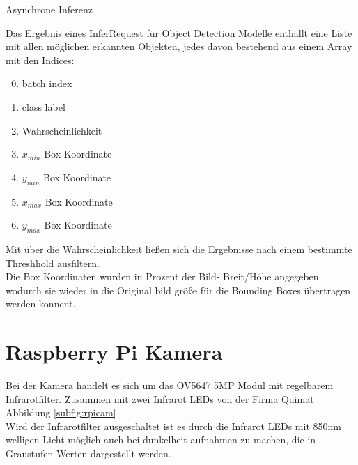 \begin{algorithm}[H]
    \caption{Asynchrone Inferenz}
\end{algorithm}


Das Ergebnis eines InferRequest für Object Detection Modelle 
enthällt eine Liste mit allen möglichen erkannten Objekten, jedes 
davon bestehend aus einem Array mit den Indices:

\begin{enumerate}
    \setcounter{enumi}{-1}
    \item batch index
    \item class label
    \item Wahrscheinlichkeit
    \item $x_{min}$ Box Koordinate
    \item $y_{min}$ Box Koordinate
    \item $x_{max}$ Box Koordinate
    \item $y_{max}$ Box Koordinate
\end{enumerate}

Mit über die Wahrscheinlichkeit ließen sich die Ergebnisse 
nach einem bestimmte Threshhold ausfiltern.\\
Die Box Koordinaten wurden in Prozent der Bild- Breit/Höhe 
angegeben wodurch sie wieder in die Original bild größe 
für die Bounding Boxes übertragen werden konnent.




\section{Raspberry Pi Kamera}\label{sec:raspicam}


Bei der Kamera handelt es sich um das OV5647 5MP Modul mit regelbarem 
Infrarotfilter. Zusammen mit zwei Infrarot LEDs von der Firma Quimat 
Abbildung \ref{subfig:rpicam}
\\
Wird der Infrarotfilter ausgeschaltet ist es durch die Infrarot LEDs mit 
850nm welligen Licht möglich auch bei dunkelheit aufnahmen zu machen, 
die in Graustufen Werten dargestellt werden.


